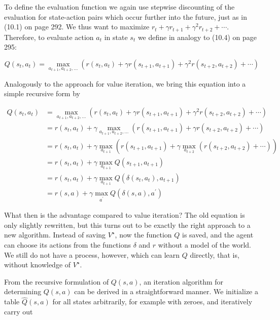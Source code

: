 \documentclass[10pt]{book}
\begin{document}
To define the evaluation function we again use stepwise discounting of the evaluation for state-action pairs which occur further into the future, just as in (10.1) on page 292. We thus want to maximize $r_{t}+\gamma r_{t+1}+\gamma^{2} r_{t+2}+\cdots$. Therefore, to evaluate action $a_{t}$ in state $s_{t}$ we define in analogy to (10.4) on page 295:

\begin{equation*}
Q\left(s_{t}, a_{t}\right)=\max _{a_{t+1}, a_{t+2}, \ldots}\left(r\left(s_{t}, a_{t}\right)+\gamma r\left(s_{t+1}, a_{t+1}\right)+\gamma^{2} r\left(s_{t+2}, a_{t+2}\right)+\cdots\right) \tag{10.10}
\end{equation*}

Analogously to the approach for value iteration, we bring this equation into a simple recursive form by

\begin{align*}
Q\left(s_{t}, a_{t}\right) & =\max _{a_{t+1}, a_{t+2}, \ldots}\left(r\left(s_{t}, a_{t}\right)+\gamma r\left(s_{t+1}, a_{t+1}\right)+\gamma^{2} r\left(s_{t+2}, a_{t+2}\right)+\cdots\right) \\
& =r\left(s_{t}, a_{t}\right)+\gamma \max _{a_{t+1}, a_{t+2}, \ldots}\left(r\left(s_{t+1}, a_{t+1}\right)+\gamma r\left(s_{t+2}, a_{t+2}\right)+\cdots\right) \\
& =r\left(s_{t}, a_{t}\right)+\gamma \max _{a_{t+1}}\left(r\left(s_{t+1}, a_{t+1}\right)+\gamma \max _{a_{t+2}}\left(r\left(s_{t+2}, a_{t+2}\right)+\cdots\right)\right) \\
& =r\left(s_{t}, a_{t}\right)+\gamma \max _{a_{t+1}} Q\left(s_{t+1}, a_{t+1}\right) \\
& =r\left(s_{t}, a_{t}\right)+\gamma \max _{a_{t+1}} Q\left(\delta\left(s_{t}, a_{t}\right), a_{t+1}\right) \\
& =r(s, a)+\gamma \max _{a^{\prime}} Q\left(\delta(s, a), a^{\prime}\right) \tag{10.11}
\end{align*}

What then is the advantage compared to value iteration? The old equation is only slightly rewritten, but this turns out to be exactly the right approach to a new algorithm. Instead of saving $V^{\star}$, now the function $Q$ is saved, and the agent can choose its actions from the functions $\delta$ and $r$ without a model of the world. We still do not have a process, however, which can learn $Q$ directly, that is, without knowledge of $V^{\star}$.

From the recursive formulation of $Q(s, a)$, an iteration algorithm for determining $Q(s, a)$ can be derived in a straightforward manner. We initialize a table $\hat{Q}(s, a)$ for all states arbitrarily, for example with zeroes, and iteratively carry out
\end{document}
